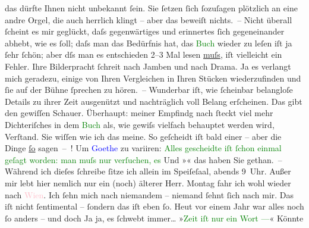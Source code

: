               das dürfte Ihnen nicht unbekannt ſein. Sie ſetzen ſich ſozuſagen plötzlich an eine
               andre Orgel, die auch herrlich klingt – {\pb}aber das
               beweiſt nichts. – Nicht überall ſcheint es mir geglückt, daſs gegenwärtiges und
               erinnertes ſich gegeneinander abhebt, wie es ſoll; daſs man das Bedürfnis hat, das
                  \textcolor{green}{Buch}{} wieder zu leſen  iſt ja ſehr ſchön; aber dſs man es entschieden
               2–3 Mal lesen \uline{muſs}, iſt vielleicht ein Fehler. Ihre
               Bilderpracht ſchreit nach Jamben {\pb}und nach Drama. Ja
               es verlangt mich geradezu, einige von Ihren Vergleichen in Ihren Stücken
               wiederzufinden und ſie auf der Bühne ſprechen zu hören. – Wunderbar iſt, wie
               ſcheinbar belangloſe Details zu ihrer Zeit ausgenützt und nachträglich voll Belang
               erſcheinen. Das gibt den gewiſſen Schauer. Überhaupt: meiner {\pb}Empfindg nach ſteckt viel mehr Dichteriſches in dem
                  \textcolor{green}{Buch}{} als, wie gewiſs vielfach
               behauptet werden wird, Verſtand. Sie wiſſen wie ich das meine. So geſcheidt iſt bald
               einer – aber die Dinge \uline{ſo} sagen – ! Um \textcolor{blue}{Goethe}{}\ledrightnote{\textcolor{blue}{Johann Wolfgang von Goethe}} zu variiren: \textcolor{green}{Alles gescheidte iſt ſchon einmal geſagt worden: man muſs nur
                  verſuchen, es \label{K_L01017_1v}\label{K_L01017_1h}}{}Und »\label{K_L01017_2v}\label{K_L01017_2h}« das haben Sie
               gethan. –\pend
           \pstart
           Während ich dieſes ſchreibe ſitze ich allein im Speiſeſaal, abends
               9 Uhr. Außer mir lebt hier nemlich nur ein (noch) älterer Herr. Montag fahr
               ich wohl wieder nach \textcolor{pink}{Wien}{}\ledrightnote{\textcolor{pink}{Wien}}. Ich ſehn mich nach
               niemandem – niemand ſehnt ſich nach mir. Das iſt nicht ſenti{\pb}mental – ſondern das iſt eben ſo. Heut vor einem Jahr
               war alles noch ſo anders – und doch \label{K_L01017_3v}\label{K_L01017_3h}{\dotstwo} Ja ja, es ſchwebt immer{\dots} »\textcolor{green}{Zeit iſt nur ein Wort —}{}« Könnte
